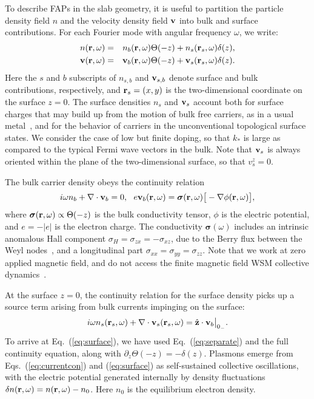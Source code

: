 \documentclass[aps,twocolumn,prl,groupedaddress]{revtex4}
\newcommand{\be}{\begin{equation}}
\newcommand{\ee}{\end{equation}}
\newcommand{\bea}{\begin{eqnarray}}
\newcommand{\eea}{\end{eqnarray}}
\renewcommand{\vec}[1]{{\bf #1}}
\begin{document}
To describe FAPs in the slab geometry, it is useful to partition 
the particle density field $n$ and the velocity density field $\vec{v}$ into 
bulk and surface contributions.
For each Fourier mode with
angular frequency $\omega$, 
we write:
\bea
\nonumber n(\vec r, \omega) &=&  n_b(\vec r, \omega) \Theta(-z) + n_s(\vec r_s, \omega) \delta(z), \\  \vec v (\vec r, \omega) &=& \vec v_b(\vec r, \omega) \Theta (-z) + \vec v_s(\vec r_s, \omega) \delta (z). 
\label{eq:separate}
\eea 
Here the $s$ and $b$ subscripts of $n_{s,b}$ and $\vec{v}_{s,b}$ denote surface and bulk contributions, respectively, and $\vec{r}_s = (x, y)$ is the two-dimensional coordinate on the surface $z = 0$. The surface densities $n_s$ and $\vec{v}_s$ account both for surface charges that may build up from the motion of bulk free carriers, as in a usual metal~\cite{fetter-b}, and for the behavior of carriers in the unconventional topological surface
states. 
We consider the case of low but finite doping, so that $k_*$ is large as compared to the typical Fermi wave vectors in the bulk.
Note that $\vec{v}_s$ is always oriented within the plane of the two-dimensional surface, so that $v_s^z = 0$.

The bulk carrier density obeys the continuity relation
 \be
  i\omega n_b  + \nabla \cdot \vec v_b  = 0,\ \  e {\vec{v}}_b (\vec{r}, \omega) = \bm{\sigma}(\vec{r}, \omega) \big[-\nabla \phi(\vec{r}, \omega)\big], 
 \label{eq:currentcon}
\ee
where $\bm{\sigma}(\vec{r}, \omega) \propto \Theta(-z)$ is the bulk conductivity tensor, 
$\phi$ is the electric potential, and $e = -|e|$ is the electron charge. The conductivity $\bm{\sigma}(\omega)$ includes an intrinsic anomalous Hall component $\sigma_{H} = \sigma_{zx} = -\sigma_{xz}$, due to the Berry flux between the Weyl nodes~\cite{burkov}, and a longitudinal part $\sigma_{xx} = \sigma_{yy} = \sigma_{zz}$. Note that we work at zero applied magnetic field, and do not access the finite magnetic field WSM collective dynamics~\cite{sonspivak,pesin,baum,xiao,spivakandreev,hoffman16}.


At the surface $z = 0$, the continuity relation for the surface density picks up a source term arising from bulk currents impinging on the surface: 
\be
i\omega n_s(\vec r_s, \omega)  +  \nabla \cdot \vec v_s (\vec r_s, \omega) =  \hat{\vec{z}} \cdot \vec v_b \big|_{0_-}.
\label{eq:surface}
\ee 
To arrive at Eq.~(\ref{eq:surface}), we have used Eq.~(\ref{eq:separate}) and the full continuity equation, along with $\partial_z \Theta (-z) = - \delta (z)$.
Plasmons emerge from Eqs.~(\ref{eq:currentcon}) and (\ref{eq:surface}) as self-sustained collective oscillations, with the electric potential 
generated internally by density fluctuations $\delta n (\vec r, \omega)= n(\vec r, \omega) - n_0$. 
Here $n_0$ is the equilibrium electron density. 
\end{document}
